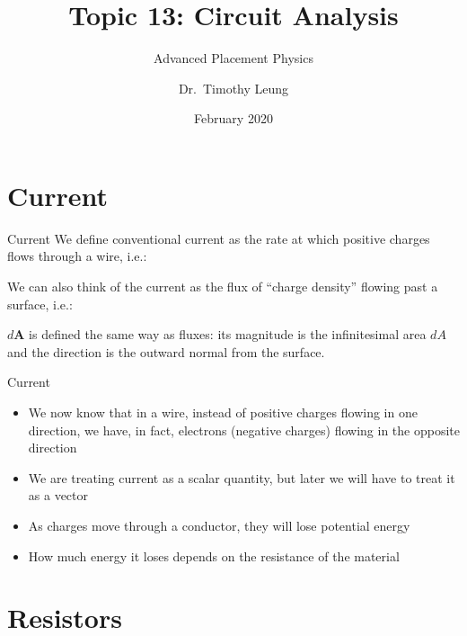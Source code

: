\documentclass[12pt,aspectratio=169]{beamer}
\title{Topic 13: Circuit Analysis}
\subtitle{Advanced Placement Physics}
\author[TML]{Dr.\ Timothy Leung}
\institute{Olympiads School, Toronto, ON, Canada}
\date{February 2020}
\newcommand{\mb}[1]{\mathbf{#1}}
\newcommand{\eq}[2]{\vspace{#1}{\Large\begin{displaymath}#2\end{displaymath}}}
\begin{document}
\begin{frame}
  \maketitle
\end{frame}

\section{Current}

\begin{frame}{Current}
  We define conventional current as the rate at which positive charges flows
  through a wire, i.e.:

  \eq{-.3in}{\boxed{I=\frac{dQ}{dt}}}

  We can also think of the current as the flux of ``charge density'' flowing
  past a surface, i.e.:
  
  \eq{-.3in}{\boxed{I=\int\mb{J}\cdot d\mb{A}}}

  $d\mb{A}$ is defined the same way as fluxes: its magnitude is the
  infinitesimal area $dA$ and the direction is the outward normal from the
  surface.
\end{frame}



\begin{frame}{Current}
  \begin{itemize}
  \item We now know that in a wire, instead of positive charges flowing in one
    direction, we have, in fact, electrons (negative charges) flowing in the
    opposite direction
  \item We are treating current as a scalar quantity, but later we will have to
    treat it as a vector
  \item As charges move through a conductor, they will lose potential energy
  \item How much energy it loses depends on the resistance of the material
  \end{itemize}
\end{frame}


\section{Resistors}
\end{document}
